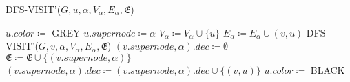 \begin{algorithm}[!H]
    \caption{DFS-VISIT'($G, u, \alpha, V_{\alpha}, E_{\alpha}, \mathfrak{E}$)}\label{alg:cap}
    \begin{algorithmic}[1]
        \State $u.color \coloneqq$ GREY
        \State $u.supernode \coloneqq \alpha$
        \State $V_{\alpha} \coloneqq V_{\alpha} \cup \{u\}$
                \State $E_{\alpha} \coloneqq E_{\alpha} \cup  (v ,u)$
            \EndIf
                \State DFS-VISIT'($G, v, \alpha, V_{\alpha}, E_{\alpha}, \mathfrak{E}$)
                \State $(v.supernode, \alpha).dec \coloneqq \emptyset$
                \State $\mathfrak{E} \coloneqq \mathfrak{E} \cup \{(v.supernode, \alpha)\}$
            \EndIf
            \State $(v.supernode, \alpha).dec \coloneqq (v.supernode, \alpha).dec \cup \{(v, u)\}$
            \EndIf
        \EndFor
        \State $u.color \coloneqq$ BLACK
    \end{algorithmic}
\end{algorithm}